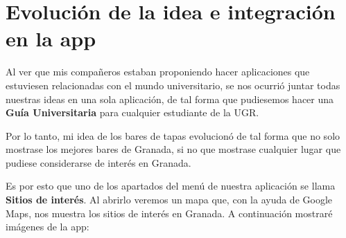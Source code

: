 \documentclass[a4paper,11pt]{article}
\begin{document}
\newpage

\section{Evolución de la idea e integración en la app}

\vspace{5 mm}

Al ver que mis compañeros estaban proponiendo hacer aplicaciones que estuviesen relacionadas con el mundo universitario, se nos ocurrió juntar todas nuestras ideas en una sola aplicación, de tal forma que pudiesemos hacer una \textbf{Guía Universitaria} para cualquier estudiante de la UGR.

\vspace{5 mm}

Por lo tanto, mi idea de los bares de tapas evolucionó de tal forma que no solo mostrase los mejores bares de Granada, si no que mostrase cualquier lugar que pudiese considerarse de interés en Granada. 

\vspace{5 mm}

Es por esto que uno de los apartados del menú de nuestra aplicación se llama \textbf{Sitios de interés}. Al abrirlo veremos un mapa que, con la ayuda de Google Maps, nos muestra los sitios de interés en Granada. A continuación mostraré imágenes de la app:

\vspace{5 mm}
\end{document}
